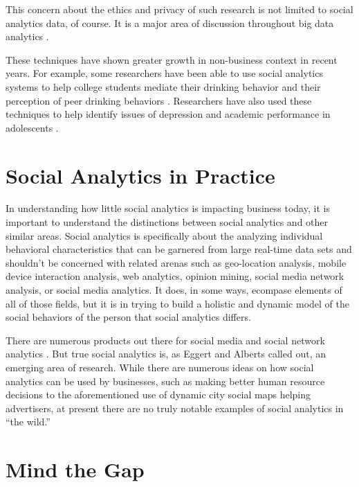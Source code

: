  This concern about the ethics and privacy of such research is not limited to social analytics data, of course. It is a major area of discussion throughout big data analytics \parencite{polonetskyPrivacyAgeBig2012a,richardsBigDataEthics2014a}.

 These techniques have shown greater growth in non-business context in recent years. For example, some researchers have been able to use social analytics systems to help college students mediate their drinking behavior and their perception of peer drinking behaviors \parencite{russellCollegeStudentsPerceptions2021}. Researchers have also used these techniques to help identify issues of depression and academic performance in adolescents \parencite{wentzelPeerSocialAcceptance2021,badriSocialConnectionSelfperceived2021}.

\section{Social Analytics in Practice}

In understanding how little social analytics is impacting business today, it is important to understand the distinctions between social analytics and other similar areas. Social analytics is specifically about the analyzing individual behavioral characteristics that can be garnered from large real-time data sets \parencite{eggertFrontiersBusinessIntelligence2020} and shouldn't be concerned with related arenas such as geo-location analysis, mobile device interaction analysis, web analytics, opinion mining, social media network analysis, or social media analytics. It does, in some ways, ecompase elements of all of those fields, but it is in trying to build a holistic and dynamic model of the social behaviors of the person that social analytics differs.

There are numerous products out there for social media and social network analytics \parencite{sivarajahRoleBigData2020}. But true social analytics is, as Eggert and Alberts called out, an emerging area of research. While there are numerous ideas on how social analytics can be used by businesses, such as making better human resource decisions \parencite{galliHowOrganizationsAre2019} to the aforementioned use of dynamic city social maps helping advertisers, at present there are no truly notable examples of social analytics in ``the wild.''

\section{Mind the Gap}

